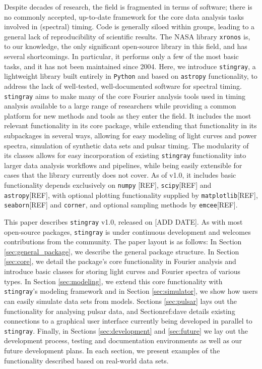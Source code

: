 \documentclass[12pt]{emulateapj}
\newcommand{\stingray}{\texttt{stingray}\xspace}
\newcommand{\python}{\texttt{Python}\xspace}
\newcommand{\astropy}{\texttt{astropy}\xspace}
\begin{document}
Despite decades of research, the field is fragmented in terms of software; there is no commonly accepted, up-to-date framework for the core data analysis tasks involved in (spectral) timing. Code is generally siloed within groups, leading to a general lack of reproducibility of scientific results. 
The NASA library \texttt{xronos} is, to our knowledge, the only significant open-source library in this field, and has several shortcomings. 
In particular, it performs only a few of the most basic tasks, and it has not been maintained since 2004. 
Here, we introduce \stingray, a lightweight library built entirely in \python and based on \astropy functionality, to address the lack of well-tested, well-documented software for spectral timing. 
\stingray aims to make many of the core Fourier analysis tools used in timing analysis available to a large range of researchers while providing a common platform for new methods and tools as they enter the field. 
It includes the most relevant functionality in its core package, while extending that functionality in its subpackages in several ways, allowing for easy modeling of light curves and power spectra, simulation of synthetic data sets and pulsar timing. 
The modularity of its classes allows for easy incorporation of existing \stingray functionality into larger data analysis workflows and pipelines, while being easily extensible for cases that the library currently does not cover. 
As of v1.0, it includes basic functionality depends exclusively on \texttt{numpy} [REF], \texttt{scipy}[REF] and \texttt{astropy}[REF], with optional plotting functionality supplied by \texttt{matplotlib}[REF], \texttt{seaborn}[REF]  and \texttt{corner}, and optional sampling methods by \texttt{emcee}[REF].

This paper describes \stingray v1.0, released on [ADD DATE]. 
As with most open-source packages, \stingray is under continuous development and welcomes contributions from the community.
The paper layout is as follows: 
In Section \ref{sec:general_package}, we describe the general package structure. 
In Section \ref{sec:core}, we detail the package's core functionality in Fourier analysis and introduce basic classes for storing light curves and Fourier spectra of various types. 
In Section \ref{sec:modeling}, we extend this core functionality with \stingray's modeling framework and in Section \ref{sec:simulator}, we show how users can easily simulate data sets from models. 
Sections \ref{sec:pulsar} lays out the functionality for analysing pulsar data, and Section{ref:dave} details existing connections to a graphical user interface currently being developed in parallel to \stingray. 
Finally, in Sections \ref{sec:development} and \ref{sec:future} we lay out the development process, testing and documentation environments as well as our future development plans. 
In each section, we present examples of the functionality described based on real-world data sets.
\end{document}
